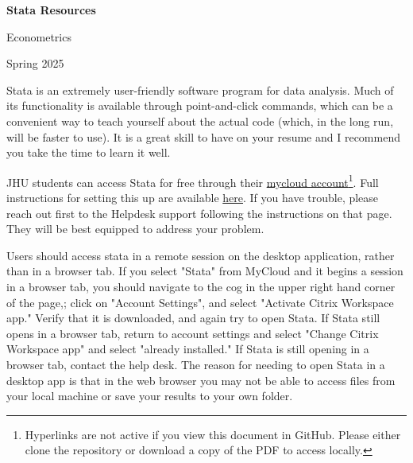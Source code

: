 \documentclass{article}
\begin{document}
\begin{center}
    \Large
    \textbf{Stata Resources}
    \normalsize

    \vspace{1mm}

    Econometrics

    \vspace{1mm}

    Spring 2025
\end{center}
\medskip

Stata is an extremely user-friendly software program for data analysis. Much of its functionality is available through point-and-click commands, which can be a convenient way to teach yourself about the actual code (which, in the long run, will be faster to use). It is a great skill to have on your resume and I recommend you take the time to learn it well.

\vspace{2mm}

JHU students can access Stata for free through their \href{http://mycloud.jh.edu/}{mycloud account}\footnote{Hyperlinks are not active if you view this document in GitHub. Please either clone the repository or download a copy of the PDF to access locally.}. Full instructions for setting this up are available \href{https://studentaffairs.jhu.edu/computing/campus-resources/myjlab/}{here}. If you have trouble, please reach out first to the Helpdesk support following the instructions on that page. They will be best equipped to address your problem.

\vspace{2mm}

Users should access stata in a remote session on the desktop application, rather than in a browser tab. If you select "Stata" from MyCloud and it begins a session in a browser tab, you should navigate to the cog in the upper right hand corner of the page,; click on "Account Settings", and select "Activate Citrix Workspace app." Verify that it is downloaded, and again try to open Stata. If Stata still opens in a browser tab, return to account settings and select "Change Citrix Workspace app" and select "already installed." If Stata is still opening in a browser tab, contact the help desk. The reason for needing to open Stata in a desktop app is that in the web browser you may not be able to access files from your local machine or save your results to your own folder. 

\vspace{2mm}
\end{document}
